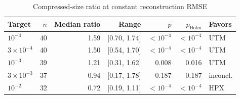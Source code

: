 \begin{table}[t]
\centering
\caption{Compressed-size ratio at constant reconstruction RMSE}
\label{tab:storage_at_rmse}
\footnotesize
\setlength{\tabcolsep}{3pt}
\begin{tabular}{lrrrrrl}
\toprule
Target & $n$ & Median ratio & Range & $p$ & $p_{\mathrm{Holm}}$ & Favors \\
\midrule
$10^{-4}$ & 40 & 1.59 & [0.70, 1.74] & $<10^{-4}$ & $<10^{-4}$ & UTM \\
$3\times10^{-4}$ & 40 & 1.50 & [0.54, 1.70] & $<10^{-4}$ & $<10^{-4}$ & UTM \\
$10^{-3}$ & 39 & 1.21 & [0.31, 1.62] & 0.008 & 0.016 & UTM \\
$3\times10^{-3}$ & 37 & 0.94 & [0.17, 1.78] & 0.187 & 0.187 & inconcl. \\
$10^{-2}$ & 32 & 0.72 & [0.19, 1.11] & $<10^{-4}$ & $<10^{-4}$ & HPX \\
\bottomrule
\end{tabular}
\end{table}
